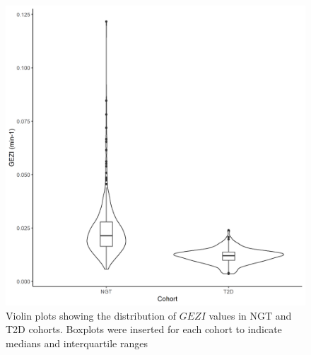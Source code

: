 \documentclass[utf8]{frontiersSCNS} %
\begin{document}
\begin{figure}[h!]
\begin{center}
\includegraphics[width=15cm]{SG_co.PNG}
\end{center}
\caption{Violin plots showing the distribution of $GEZI$ values in NGT and T2D cohorts. Boxplots were inserted for each cohort to indicate medians and interquartile ranges}
\label{fig: SG_co}
\end{figure}
\end{document}
